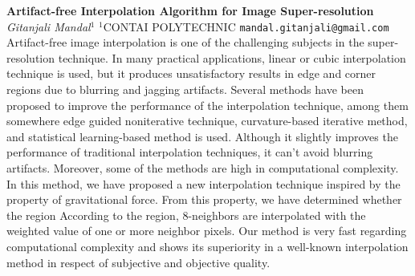 
    \begin{conf-abstract}[]
        {\textbf{Artifact-free Interpolation Algorithm for Image Super-resolution}}
        {\textit{Gitanjali Mandal$^{1}$}}
        {$^{1}$CONTAI POLYTECHNIC}
        {\texttt{mandal.gitanjali@gmail.com}}
        {Artifact-free image interpolation is one of the challenging subjects in the super-resolution technique. In many practical applications, linear or cubic interpolation technique is used, but it produces unsatisfactory results in edge and corner regions due to blurring and jagging artifacts. Several methods have been proposed to improve the performance of the interpolation technique, among them somewhere edge guided noniterative technique, curvature-based iterative method, and statistical learning-based method is used. Although it slightly improves the performance of traditional interpolation techniques, it can't avoid blurring artifacts. Moreover, some of the methods are high in computational complexity. In this method, we have proposed a new interpolation technique inspired by the property of gravitational force.  From this property, we have determined whether the region According to the region, 8-neighbors are interpolated with the weighted value of one or more neighbor pixels. Our method is very fast regarding computational complexity and shows its superiority in a well-known interpolation method in respect of subjective and objective quality.  }
    \end{conf-abstract}
        